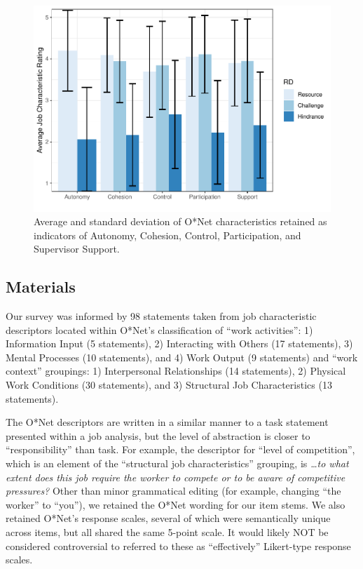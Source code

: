 \documentclass[
  man]{apa6}
\begin{document}
\begin{figure}
\centering
\includegraphics{Submission_files/figure-latex/litresources-1.pdf}
\caption{\label{fig:litresources}Average and standard deviation of O*Net characteristics retained as indicators of Autonomy, Cohesion, Control, Participation, and Supervisor Support.}
\end{figure}

\hypertarget{materials}{%
\subsection{Materials}\label{materials}}

Our survey was informed by 98 statements taken from job characteristic descriptors located within O*Net's classification of ``work activities'': 1) Information Input (5 statements), 2) Interacting with Others (17 statements), 3) Mental Processes (10 statements), and 4) Work Output (9 statements) and ``work context'' groupings: 1) Interpersonal Relationships (14 statements), 2) Physical Work Conditions (30 statements), and 3) Structural Job Characteristics (13 statements).

The O*Net descriptors are written in a similar manner to a task statement presented within a job analysis, but the level of abstraction is closer to ``responsibility'' than task. For example, the descriptor for ``level of competition'', which is an element of the ``structural job characteristics'' grouping, is \emph{\ldots to what extent does this job require the worker to compete or to be aware of competitive pressures?} Other than minor grammatical editing (for example, changing ``the worker'' to ``you''), we retained the O*Net wording for our item stems. We also retained O*Net's response scales, several of which were semantically unique across items, but all shared the same 5-point scale. It would likely NOT be considered controversial to referred to these as ``effectively'' Likert-type response scales.
\end{document}
